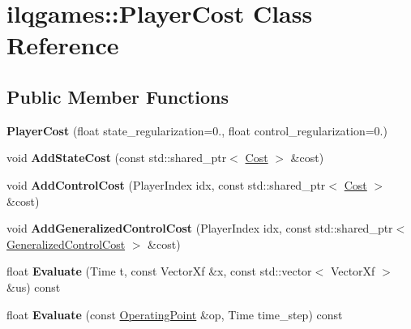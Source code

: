 \hypertarget{classilqgames_1_1_player_cost}{}\section{ilqgames\+:\+:Player\+Cost Class Reference}
\label{classilqgames_1_1_player_cost}
\subsection*{Public Member Functions}
\begin{DoxyCompactItemize}
\item 
{\bfseries Player\+Cost} (float state\+\_\+regularization=0., float control\+\_\+regularization=0.)\hypertarget{classilqgames_1_1_player_cost_a983c96844cf283233a3c041b58453349}{}\label{classilqgames_1_1_player_cost_a983c96844cf283233a3c041b58453349}

\item 
void {\bfseries Add\+State\+Cost} (const std\+::shared\+\_\+ptr$<$ \hyperlink{classilqgames_1_1_cost}{Cost} $>$ \&cost)\hypertarget{classilqgames_1_1_player_cost_a3135d5f4c7722edc1ae385e0ecafcc87}{}\label{classilqgames_1_1_player_cost_a3135d5f4c7722edc1ae385e0ecafcc87}

\item 
void {\bfseries Add\+Control\+Cost} (Player\+Index idx, const std\+::shared\+\_\+ptr$<$ \hyperlink{classilqgames_1_1_cost}{Cost} $>$ \&cost)\hypertarget{classilqgames_1_1_player_cost_aba4df0e6414aba024c86bf77fe57f819}{}\label{classilqgames_1_1_player_cost_aba4df0e6414aba024c86bf77fe57f819}

\item 
void {\bfseries Add\+Generalized\+Control\+Cost} (Player\+Index idx, const std\+::shared\+\_\+ptr$<$ \hyperlink{classilqgames_1_1_generalized_control_cost}{Generalized\+Control\+Cost} $>$ \&cost)\hypertarget{classilqgames_1_1_player_cost_aebc6b1776b4f5d71df75b68028442efd}{}\label{classilqgames_1_1_player_cost_aebc6b1776b4f5d71df75b68028442efd}

\item 
float {\bfseries Evaluate} (Time t, const Vector\+Xf \&x, const std\+::vector$<$ Vector\+Xf $>$ \&us) const \hypertarget{classilqgames_1_1_player_cost_ac1ad99a1822d97a53d084fd9da162cb1}{}\label{classilqgames_1_1_player_cost_ac1ad99a1822d97a53d084fd9da162cb1}

\item 
float {\bfseries Evaluate} (const \hyperlink{structilqgames_1_1_operating_point}{Operating\+Point} \&op, Time time\+\_\+step) const \hypertarget{classilqgames_1_1_player_cost_a8c7fc17986dfb478df17cf9f8da85926}{}\label{classilqgames_1_1_player_cost_a8c7fc17986dfb478df17cf9f8da85926}


\end{DoxyCompactItemize}
